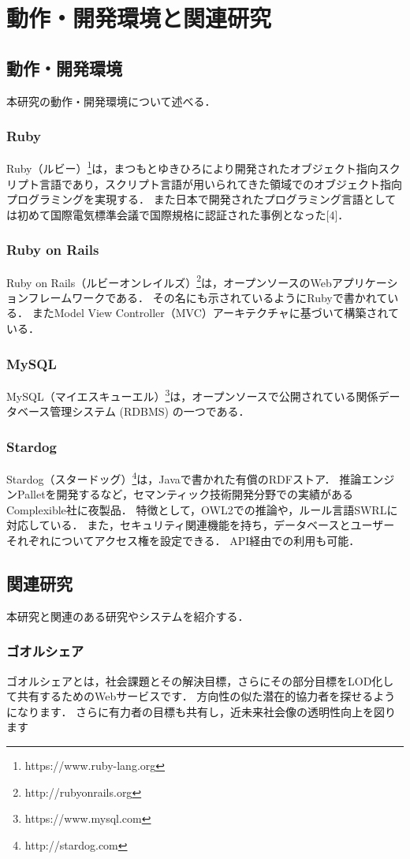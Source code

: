\chapter{動作・開発環境と関連研究}
\section{動作・開発環境}
本研究の動作・開発環境について述べる．

\subsection{Ruby}
Ruby（ルビー）\footnote{https://www.ruby-lang.org}は，まつもとゆきひろにより開発されたオブジェクト指向スクリプト言語であり，スクリプト言語が用いられてきた領域でのオブジェクト指向プログラミングを実現する．
また日本で開発されたプログラミング言語としては初めて国際電気標準会議で国際規格に認証された事例となった[4]．

\subsection{Ruby on Rails}
Ruby on Rails（ルビーオンレイルズ）\footnote{http://rubyonrails.org}は，オープンソースのWebアプリケーションフレームワークである．
その名にも示されているようにRubyで書かれている．
またModel View Controller（MVC）アーキテクチャに基づいて構築されている．

\subsection{MySQL}
MySQL（マイエスキューエル）\footnote{https://www.mysql.com}は，オープンソースで公開されている関係データベース管理システム (RDBMS) の一つである．

\subsection{Stardog}
Stardog（スタードッグ）\footnote{http://stardog.com}は，Javaで書かれた有償のRDFストア．
推論エンジンPalletを開発するなど，セマンティック技術開発分野での実績があるComplexible社に夜製品．
特徴として，OWL2での推論や，ルール言語SWRLに対応している．
また，セキュリティ関連機能を持ち，データベースとユーザーそれぞれについてアクセス権を設定できる．
API経由での利用も可能．

\section{関連研究}
本研究と関連のある研究やシステムを紹介する．

\subsection{ゴオルシェア}
ゴオルシェア\cite{shiramatsu2016}とは，社会課題とその解決目標，さらにその部分目標をLOD化して共有するためのWebサービスです．
方向性の似た潜在的協力者を探せるようになります．
さらに有力者の目標も共有し，近未来社会像の透明性向上を図ります
